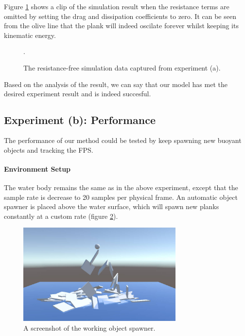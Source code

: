 Figure \ref{experiment-no-resistance} shows a clip of the simulation result when the resistance terms are omitted by setting the drag and  dissipation coefficients to zero.
It can be seen from the olive line that the plank will indeed oscilate forever whilst keeping its kinematic energy.

\begin{figure}[htb]
	\centering
	\caption{The resistance-free simulation data captured from experiment (a).}.
	\label{experiment-no-resistance}
\end{figure}

Based on the analysis of the result, we can say that our model has met the desired experiment result and is indeed succesful.

\subsection{Experiment (b): Performance}

The performance of our method could be tested by keep spawning new buoyant objects and tracking the FPS.

\paragraph{Environment Setup}

The water body remains the same as in the above experiment, except that the sample rate is decrease to 20 samples per physical frame.
An automatic object spawner is placed above the water surface, which will spawn new planks constantly at a custom rate (figure \ref{spawner-setup}).

\begin{figure}[h]
	\centering
	\includegraphics[height=2in]{figures/spawner-setup.jpg}
	\caption{A screenshot of the working object spawner.}
	\label{spawner-setup}
\end{figure}

